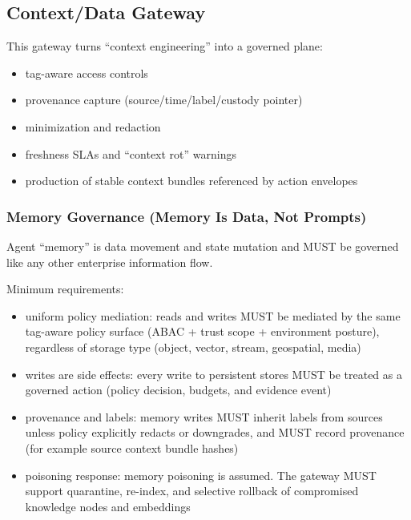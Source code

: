 \documentclass[11pt]{article}
\begin{document}
\hypertarget{contextdata-gateway}{%
\subsection{Context/Data Gateway}\label{contextdata-gateway}}

This gateway turns ``context engineering'' into a governed plane:

\begin{itemize}
\tightlist
\item
  tag-aware access controls
\item
  provenance capture (source/time/label/custody pointer)
\item
  minimization and redaction
\item
  freshness SLAs and ``context rot'' warnings
\item
  production of stable context bundles referenced by action envelopes
\end{itemize}

\hypertarget{memory-governance-memory-is-data-not-prompts}{%
\subsubsection{Memory Governance (Memory Is Data, Not Prompts)}\label{memory-governance-memory-is-data-not-prompts}}

Agent ``memory'' is data movement and state mutation and MUST be
governed like any other enterprise information flow.

Minimum requirements:

\begin{itemize}
\tightlist
\item
  uniform policy mediation: reads and writes MUST be mediated by the
  same tag-aware policy surface (ABAC + trust scope + environment
  posture), regardless of storage type (object, vector, stream,
  geospatial, media)
\item
  writes are side effects: every write to persistent stores MUST be
  treated as a governed action (policy decision, budgets, and evidence
  event)
\item
  provenance and labels: memory writes MUST inherit labels from sources
  unless policy explicitly redacts or downgrades, and MUST record
  provenance (for example source context bundle hashes)
\item
  poisoning response: memory poisoning is assumed. The gateway MUST
  support quarantine, re-index, and selective rollback of compromised
  knowledge nodes and embeddings
\end{itemize}
\end{document}
